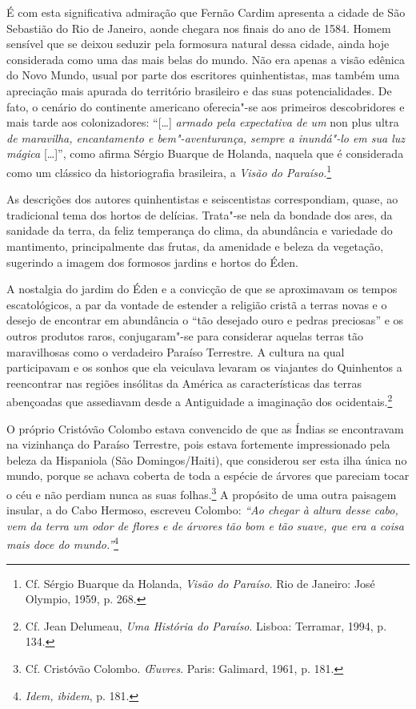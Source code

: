 É com esta significativa admiração que Fernão Cardim
apresenta a cidade de São Sebastião do Rio de Janeiro, aonde chegara nos
finais do ano de 1584. Homem sensível que se deixou seduzir pela
formosura natural dessa cidade, ainda hoje considerada como uma das
mais belas do mundo. Não era apenas a visão edênica do Novo Mundo,
usual por parte dos escritores quinhentistas, mas também uma
apreciação mais apurada do território brasileiro e das suas
potencialidades. De fato, o cenário do continente americano
oferecia"-se aos primeiros descobridores e mais tarde aos
colonizadores: ``[\ldots{}] \textit{armado pela expectativa de um} non plus ultra \textit{de maravilha, 
encantamento e bem"-aventurança, sempre a inundá"-lo em sua luz mágica} [\ldots{}]'',
como afirma Sérgio Buarque de Holanda, naquela que
é considerada como um clássico da historiografia brasileira, a
\textit{Visão do Paraíso.}\footnote{ Cf. Sérgio Buarque da Holanda,
\textit{Visão do Paraíso}. Rio de Janeiro: José Olympio, 1959, p. 268.}

As descrições dos autores quinhentistas e seiscentistas
correspondiam, quase, ao tradicional tema dos hortos de delícias.
Trata"-se nela da bondade dos ares, da sanidade da terra, da feliz
temperança do clima, da abundância e variedade do mantimento,
principalmente das frutas, da amenidade e beleza da vegetação,
sugerindo a imagem dos formosos jardins e hortos do Éden.

A nostalgia do jardim do Éden e a convicção de que se aproximavam os
tempos escatológicos, a par da vontade de estender a religião cristã a
terras novas e o desejo de encontrar em abundância o ``tão desejado
ouro e pedras preciosas'' e os outros produtos raros, conjugaram"-se
para considerar aquelas terras tão maravilhosas como o verdadeiro
Paraíso Terrestre. A cultura na qual participavam e os sonhos que ela
veiculava levaram os viajantes do Quinhentos a reencontrar nas regiões
insólitas da América as características das terras abençoadas que
assediavam desde a Antiguidade a imaginação dos ocidentais.\footnote{ Cf. Jean Delumeau, 
\textit{Uma História do Paraíso}. Lisboa: Terramar, 1994, p. 134.} 

 O próprio Cristóvão Colombo estava convencido de que as 
Índias se encontravam na vizinhança do Paraíso Terrestre, pois estava
fortemente impressionado pela beleza da Hispaniola (São
Domingos/Haiti), que considerou ser esta ilha única no mundo, porque se
achava coberta de toda a espécie de árvores que pareciam tocar o céu e
não perdiam nunca as suas folhas.\footnote{ Cf. Cristóvão
Colombo. \textit{\OE uvres}. Paris: Galimard, 1961, p. 181.} A
propósito de uma outra paisagem insular, a do Cabo Hermoso, escreveu
Colombo: \textit{``Ao chegar à altura desse cabo, vem da terra um
odor de flores e de árvores tão bom e tão suave, que era a coisa mais
doce do mundo.''}\footnote{ \textit{Idem, ibidem}, p. 181.} 


